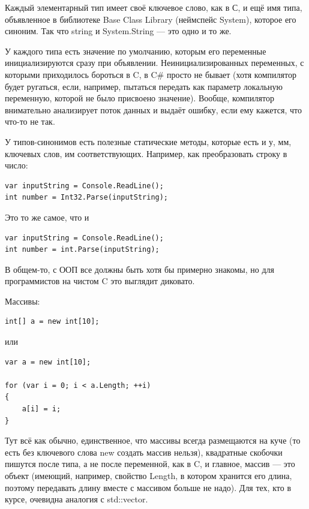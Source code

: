\documentclass[a5paper]{article}
\begin{document}
Каждый элементарный тип имеет своё ключевое слово, как в С, и ещё имя типа, объявленное в библиотеке Base Class Library (неймспейс System), которое его синоним. Так что string и System.String --- это одно и то же.

У каждого типа есть значение по умолчанию, которым его переменные инициализируются сразу при объявлении. Неинициализированных переменных, с которыми приходилось бороться в C, в C\# просто не бывает (хотя компилятор будет ругаться, если, например, пытаться передать как параметр локальную переменную, которой не было присвоено значение). Вообще, компилятор внимательно анализирует поток данных и выдаёт ошибку, если ему кажется, что что-то не так.

У типов-синонимов есть полезные статические методы, которые есть и у, мм, ключевых слов, им соответствующих. Например, как преобразовать строку в число:

\begin{verbatim}
var inputString = Console.ReadLine();
int number = Int32.Parse(inputString);
\end{verbatim}

Это то же самое, что и

\begin{verbatim}
var inputString = Console.ReadLine();
int number = int.Parse(inputString);
\end{verbatim}

В общем-то, с ООП все должны быть хотя бы примерно знакомы, но для программистов на чистом C это выглядит диковато.

Массивы:

\begin{verbatim}
int[] a = new int[10];
\end{verbatim}

или

\begin{verbatim}
var a = new int[10];

for (var i = 0; i < a.Length; ++i)
{
    a[i] = i;
}
\end{verbatim}

Тут всё как обычно, единственное, что массивы всегда размещаются на куче (то есть без ключевого слова new создать массив нельзя), квадратные скобочки пишутся после типа, а не после переменной, как в C, и главное, массив --- это объект (имеющий, например, свойство Length, в котором хранится его длина, поэтому передавать длину вместе с массивом больше не надо). Для тех, кто в курсе, очевидна аналогия с std::vector.
\end{document}
